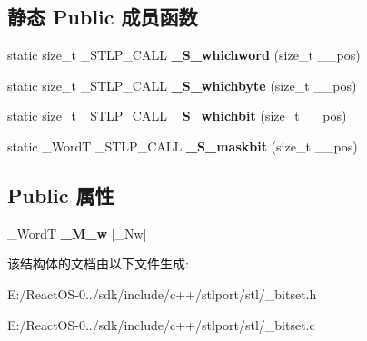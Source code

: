 \subsection*{静态 Public 成员函数}
\begin{DoxyCompactItemize}
\item 
\mbox{\label{struct___base__bitset_aee4e17fdd10f90474ce92c5ba1e4a067}} 
static size\+\_\+t \+\_\+\+S\+T\+L\+P\+\_\+\+C\+A\+LL {\bfseries \+\_\+\+S\+\_\+whichword} (size\+\_\+t \+\_\+\+\_\+pos)
\item 
\mbox{\label{struct___base__bitset_a206b96a68e096de90193ad7197c12bd5}} 
static size\+\_\+t \+\_\+\+S\+T\+L\+P\+\_\+\+C\+A\+LL {\bfseries \+\_\+\+S\+\_\+whichbyte} (size\+\_\+t \+\_\+\+\_\+pos)
\item 
\mbox{\label{struct___base__bitset_afc8dd48ca099f95e30c802cb49b428a8}} 
static size\+\_\+t \+\_\+\+S\+T\+L\+P\+\_\+\+C\+A\+LL {\bfseries \+\_\+\+S\+\_\+whichbit} (size\+\_\+t \+\_\+\+\_\+pos)
\item 
\mbox{\label{struct___base__bitset_a34c8e3feb322e2d8db85ee245271e7da}} 
static \+\_\+\+WordT \+\_\+\+S\+T\+L\+P\+\_\+\+C\+A\+LL {\bfseries \+\_\+\+S\+\_\+maskbit} (size\+\_\+t \+\_\+\+\_\+pos)
\end{DoxyCompactItemize}
\subsection*{Public 属性}
\begin{DoxyCompactItemize}
\item 
\mbox{\label{struct___base__bitset_ab90b768c9a9930f48a48d9a6ffce75fc}} 
\+\_\+\+WordT {\bfseries \+\_\+\+M\+\_\+w} \mbox{[}\+\_\+\+Nw\mbox{]}
\end{DoxyCompactItemize}


该结构体的文档由以下文件生成\+:\begin{DoxyCompactItemize}
\item 
E\+:/\+React\+O\+S-\/0../sdk/include/c++/stlport/stl/\+\_\+bitset.\+h\item 
E\+:/\+React\+O\+S-\/0../sdk/include/c++/stlport/stl/\+\_\+bitset.\+c\end{DoxyCompactItemize}
